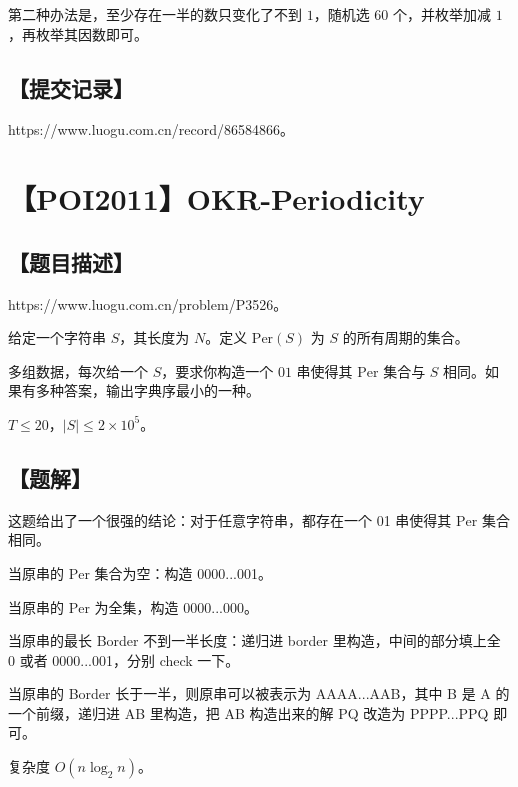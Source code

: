 \documentclass[UTF8,12pt,a4paper]{ctexart}
\begin{document}
	第二种办法是，至少存在一半的数只变化了不到 $1$，随机选 $60$ 个，并枚举加减 $1$，再枚举其因数即可。
	
	\subsection*{【提交记录】}
	
	https://www.luogu.com.cn/record/86584866。
	
	
	\section*{【POI2011】OKR-Periodicity}
	
	\subsection*{【题目描述】}
	
	https://www.luogu.com.cn/problem/P3526。
	
	给定一个字符串 $S$，其长度为 $N$。定义 $\textrm{Per}(S)$ 为 $S$ 的所有周期的集合。
	
	多组数据，每次给一个 $S$，要求你构造一个 $01$ 串使得其 $\textrm{Per}$ 集合与 $S$ 相同。如果有多种答案，输出字典序最小的一种。
	
	$T \leq 20$，$|S| \leq 2 \times 10^5$。
	
	\subsection*{【题解】}
	
	这题给出了一个很强的结论：对于任意字符串，都存在一个 01 串使得其 $\textrm{Per}$ 集合相同。
	
	当原串的 $\textrm{Per}$ 集合为空：构造 0000...001。
	
	当原串的 $\textrm{Per}$ 为全集，构造 0000...000。
	
	当原串的最长 Border 不到一半长度：递归进 border 里构造，中间的部分填上全 0 或者 0000...001，分别 check 一下。
	
	当原串的 Border 长于一半，则原串可以被表示为 AAAA...AAB，其中 B 是 A 的一个前缀，递归进 AB 里构造，把 AB 构造出来的解 PQ 改造为 PPPP...PPQ 即可。
	
	复杂度 $O(n\log_2n)$。
	
\end{document}
